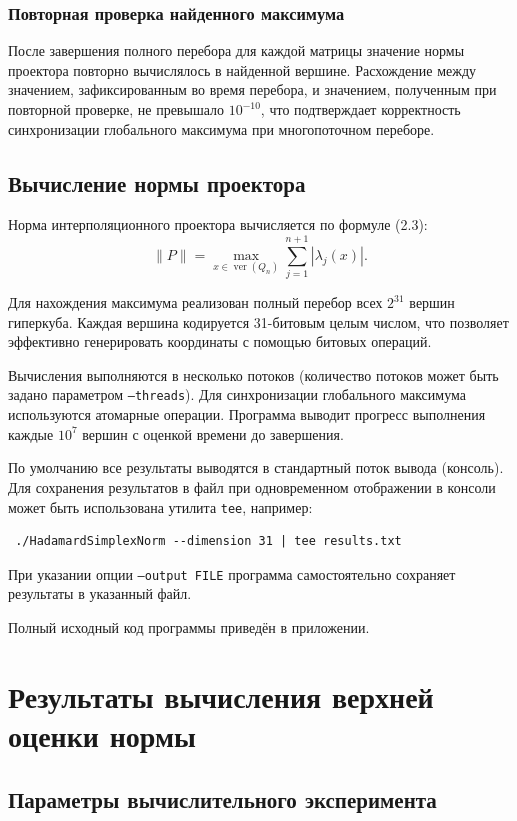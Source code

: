 \documentclass[a4paper,12pt]{article}
\theoremstyle{indented}
\begin{document}
\subsubsection{Повторная проверка найденного максимума}

После завершения полного перебора для каждой матрицы значение нормы проектора повторно вычислялось в найденной вершине. Расхождение между значением, зафиксированным во время перебора, и значением, полученным при повторной проверке, не превышало $10^{-10}$, что подтверждает корректность синхронизации глобального максимума при многопоточном переборе.

\subsection{Вычисление нормы проектора}

Норма интерполяционного проектора вычисляется по формуле (2.3):
\[
\|P\| = \max_{x \in \operatorname{ver}(Q_n)} \sum_{j=1}^{n+1} |\lambda_j(x)|.
\]

Для нахождения максимума реализован полный перебор всех $2^{31}$ вершин гиперкуба. Каждая вершина кодируется 31-битовым целым числом, что позволяет эффективно генерировать координаты с помощью битовых операций.

Вычисления выполняются в несколько потоков (количество потоков может быть задано параметром \texttt{--threads}). Для синхронизации глобального максимума используются атомарные операции. Программа выводит прогресс выполнения каждые $10^7$ вершин с оценкой времени до завершения.

По умолчанию все результаты выводятся в стандартный поток вывода (консоль). Для сохранения результатов в файл при одновременном отображении в консоли может быть использована утилита \texttt{tee}, например:
\begin{verbatim}
 ./HadamardSimplexNorm --dimension 31 | tee results.txt
\end{verbatim}
При указании опции \texttt{--output FILE} программа самостоятельно сохраняет результаты в указанный файл.

Полный исходный код программы приведён в приложении.
\section{Результаты вычисления верхней оценки нормы}

\subsection{Параметры вычислительного эксперимента}
\end{document}

